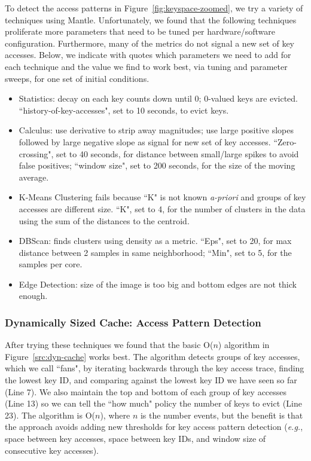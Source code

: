 To detect the access patterns in Figure~\ref{fig:keyspace-zoomed}, we try a
variety of techniques using Mantle. Unfortunately, we found that the following
techniques proliferate more parameters that need to be tuned per
hardware/software configuration. Furthermore, many of the metrics do not signal
a new set of key accesses.  Below, we indicate with quotes which parameters we
need to add for each technique and the value we find to work best, via
tuning and parameter sweeps, for one set of initial conditions.

\begin{itemize}

  \item Statistics: decay on each key counts down until 0; 0-valued keys are
evicted.  ``history-of-key-accesses", set to 10 seconds, to evict keys.

  \item Calculus: use derivative to strip away magnitudes; use large positive
slopes followed by large negative slope as signal for new set of key accesses.
``Zero-crossing", set to 40 seconds, for distance between small/large spikes to
avoid false positives; ``window size", set to 200 seconds, for the size of the
moving average.

  \item K-Means Clustering fails because ``K" is not known {\it a-priori} and
groups of key accesses are different size. ``K", set to 4, for the number of clusters in the data
using the sum of the distances to the centroid.

  \item DBScan: finds clusters using density as a metric. ``Eps", set to 20, for
max distance between 2 samples in same neighborhood; ``Min", set to 5, for the
samples per core.

  \item Edge Detection: size of the image is too big and bottom edges are
not thick enough.

\end{itemize}

\subsubsection{Dynamically Sized Cache: Access Pattern Detection}
\label{sec:regime-detection}

After trying these techniques we found that the basic O(\(n\)) algorithm in
Figure~\ref{src:dyn-cache} works best. The algorithm detects groups of key
accesses, which we call ``fans", by iterating backwards through the key access
trace, finding the lowest key ID, and comparing against the lowest key ID we
have seen so far (Line 7). We also maintain the top and bottom of each group of
key accesses (Line 13) so we can tell the ``how much" policy the number of keys
to evict (Line 23).  The algorithm is O(\(n\)), where \(n\) is the number
events, but the benefit is that the approach avoids adding new thresholds for
key access pattern detection ({\it e.g.}, space between key accesses, space
between key IDs, and window size of consecutive key accesses).

